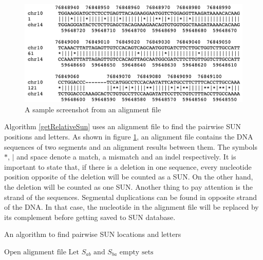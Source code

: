 \begin{figure}[ht]
    \centering
    \includegraphics[scale=0.4]{images/alignmentFile.png}
    \caption{A sample screenshot from an alignment file}
    \label{alignmentFile}
\end{figure}

Algorithm \ref{getRelativeSun} uses an alignment file to find the pairwise SUN positions and letters. As shown in figure \ref{alignmentFile}, an alignment file contains the DNA sequences of two segments and an alignment results between them. The symbols $*$, $|$ and space denote a match, a mismatch and an indel respectively. It is important to state that, if there is a deletion in one sequence, every nucleotide position opposite of the deletion will be counted as a SUN. On the other hand, the deletion will be counted as one SUN. Another thing to pay attention is the strand of the sequences. Segmental duplications can be found in opposite strand of the DNA. In that case, the nucleotide in the alignment file will be replaced by its complement before getting saved to SUN database.

\begin{algorithm}
\caption{An algorithm to find pairwise SUN locations and letters}
\label{getRelativeSun}
\begin{algorithmic}[1]
\State $\text{Open alignment file}$
\State $\text{Let } S_{ab} \text{ and } S_{ba} \text{ empty sets}$
\EndIf
{}
\EndIf
{}
\EndIf
{}
\EndIf
\EndIf
\EndFor
\EndWhile
\EndIf
\EndProcedure
\end{algorithmic}
\end{algorithm}


